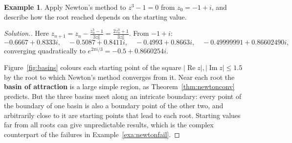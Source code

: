 \documentclass[11pt,a4paper]{article}
\numberwithin{equation}{section}
\theoremstyle{definition}
\newtheorem{exa}[thm]{Example}
\newenvironment{solution}
  {\renewcommand{\qedsymbol}{}\begin{proof}[\textit{Solution}.]}
  {\end{proof}}
\begin{document}
\begin{exa}
\label{exa:basins}
Apply Newton's method to $z^3-1 = 0$ from $z_0 = -1+i$, and describe how the root reached depends on the starting value.
\end{exa}

\begin{solution}
Here $z_{n+1} = z_n-\frac{z_n^3-1}{3z_n^2} = \frac{2z_n^3+1}{3z_n^2}$. From $-1+i$:
$$-0.6667+0.8333i,\quad -0.5087+0.8411i,\quad -0.4993+0.8663i,\quad -0.49999991+0.86602490i,$$
converging quadratically to $e^{2\pi i/3} = -0.5+0.8660254i$.

Figure~\ref{fig:basins} colours each starting point of the square $|\operatorname{Re}z|,|\operatorname{Im}z|\leq1.5$ by the root to which Newton's
method converges from it. Near each root the \textbf{basin of attraction} is a large simple region, as Theorem~\ref{thm:newtonconv} predicts.
But the three basins meet along an intricate boundary: every point of the boundary of one basin is also a boundary point of the other two,
and arbitrarily close to it are starting points that lead to each root. Starting values far from all roots can give unpredictable results,
which is the complex counterpart of the failures in Example~\ref{exa:newtonfail}.
\end{solution}
\end{document}
